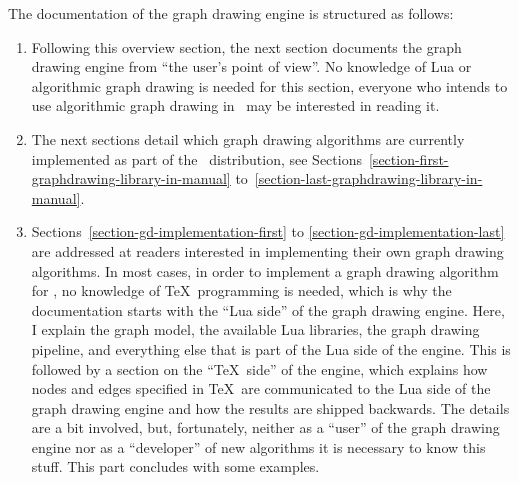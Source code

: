 The documentation of the graph drawing engine is structured as
follows:
\begin{enumerate}
\item Following this overview section, the next section documents
  the graph drawing engine from ``the user's point of view''. No
  knowledge of Lua or algorithmic graph drawing is needed for this
  section, everyone who intends to use algorithmic graph drawing in
  \tikzname\ may be interested in reading it.
\item The next sections detail which graph drawing algorithms are
  currently implemented as part of the \tikzname\ distribution, see
  Sections~\ref{section-first-graphdrawing-library-in-manual}
  to~\ref{section-last-graphdrawing-library-in-manual}.
\item Sections~\ref{section-gd-implementation-first} to
  \ref{section-gd-implementation-last} are addressed at readers
  interested in implementing their own graph drawing
  algorithms. In most cases, in order to implement a graph drawing
  algorithm for \tikzname, no knowledge of \TeX\ programming is
  needed, which is why the documentation starts with the ``Lua side''
  of the graph drawing engine. Here, I explain the graph model, the
  available Lua libraries, the graph drawing pipeline, and everything
  else that is part of the Lua side of the engine. This is followed by
  a section on the ``\TeX\ side'' of the engine, which explains how
  nodes and edges specified in \TeX\ are communicated to the Lua side
  of the graph drawing engine and how the results are shipped
  backwards. The details are a bit involved, but, fortunately, neither
  as a ``user'' of the graph drawing engine nor as a ``developer'' of
  new algorithms it is necessary to know this stuff. This part
  concludes with some examples.
\end{enumerate}
